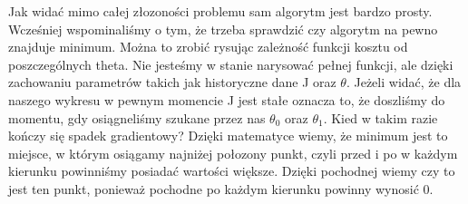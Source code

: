 Jak widać mimo całej złozoności problemu sam algorytm jest bardzo prosty. Wcześniej wspominaliśmy o tym, że trzeba sprawdzić czy algorytm na pewno znajduje minimum. Można to zrobić rysując zależność funkcji kosztu od poszczególnych theta. Nie jesteśmy w stanie narysować pełnej funkcji, ale dzięki zachowaniu parametrów takich jak historyczne dane J oraz $\theta$. Jeżeli widać, że dla naszego wykresu w pewnym momencie J jest stałe oznacza to, że doszliśmy do momentu, gdy osiągneliśmy szukane przez nas $\theta_{0}$ oraz $\theta_{1}$.
\newline
\newline
\noindent
Kied w takim razie kończy się spadek gradientowy? Dzięki matematyce wiemy, że minimum jest to miejsce, w którym osiągamy najniżej połozony punkt, czyli przed i po w każdym kierunku powinniśmy posiadać wartości większe. Dzięki pochodnej wiemy czy to jest ten punkt, ponieważ pochodne po każdym kierunku powinny wynosić 0.